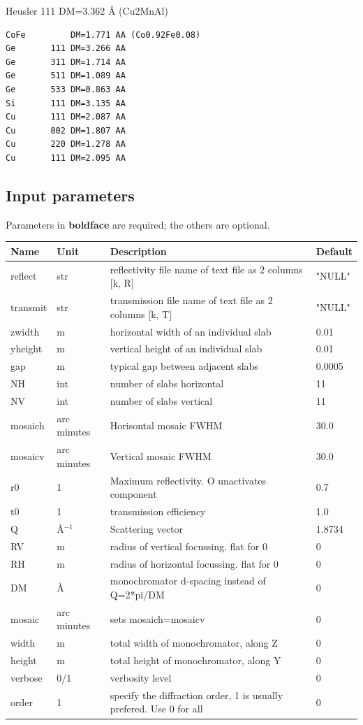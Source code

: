 Heusler 111 DM=3.362 \AA{} (Cu2MnAl)

\begin{verbatim}
CoFe         DM=1.771 AA (Co0.92Fe0.08)
Ge       111 DM=3.266 AA
Ge       311 DM=1.714 AA
Ge       511 DM=1.089 AA
Ge       533 DM=0.863 AA
Si       111 DM=3.135 AA
Cu       111 DM=2.087 AA
Cu       002 DM=1.807 AA
Cu       220 DM=1.278 AA
Cu       111 DM=2.095 AA
\end{verbatim}

\subsection*{Input parameters}
Parameters in \textbf{boldface} are required; the others are optional.

\begin{longtable}{p{}p{}p{}p{}}
\toprule
\textbf{Name} & \textbf{Unit} & \textbf{Description} & \textbf{Default} \\
\midrule
\endhead
reflect & str & reflectivity file name of text file as 2 columns [k, R] & "NULL" \\
transmit & str & transmission file name of text file as 2 columns [k, T] & "NULL" \\
zwidth & m & horizontal width of an individual slab & 0.01 \\
yheight & m & vertical height of an individual slab & 0.01 \\
gap & m & typical gap  between adjacent slabs & 0.0005 \\
NH & int & number of slabs horizontal & 11 \\
NV & int & number of slabs vertical & 11 \\
mosaich & arc minutes & Horisontal mosaic FWHM & 30.0 \\
mosaicv & arc minutes & Vertical mosaic FWHM & 30.0 \\
r0 & 1 & Maximum reflectivity. O unactivates component & 0.7 \\
t0 & 1 & transmission efficiency & 1.0 \\
Q & \AA{}$^{-1}$ & Scattering vector & 1.8734 \\
RV & m & radius of vertical focussing. flat for 0 & 0 \\
RH & m & radius of horizontal focussing. flat for 0 & 0 \\
DM & \AA{} & monochromator d-spacing instead of Q=2*pi/DM & 0 \\
mosaic & arc minutes & sets mosaich=mosaicv & 0 \\
width & m & total width of monochromator, along Z & 0 \\
height & m & total height of monochromator, along Y & 0 \\
verbose & 0/1 & verbosity level & 0 \\
order & 1 & specify the diffraction order, 1 is usually prefered. Use 0 for all & 0 \\
\bottomrule
\end{longtable}

